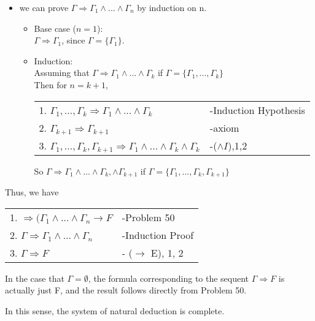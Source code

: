 \begin{enumerate}
\begin{itemize}
	\item we can prove $\Gamma \Rightarrow \Gamma_1 \wedge ... \wedge \Gamma_n$ by induction on n.\\
	  \begin{itemize}
		\item Base case ($n=1$):\\
		  $\Gamma \Rightarrow \Gamma_1$, since $\Gamma=\{\Gamma_1\}$.
		\item Induction:\\
		  Assuming that $\Gamma \Rightarrow \Gamma_1 \wedge ... \wedge \Gamma_k$ if $\Gamma=\{\Gamma_1, ..., \Gamma_k\}$\\
		  Then for $n=k+1$, \\
			\begin{tabular}{l l}
		  1. $\Gamma_1, ..., \Gamma_k \Rightarrow \Gamma_1 \wedge ... \wedge \Gamma_k$ & -Induction Hypothesis\\
											2. $\Gamma_{k+1} \Rightarrow \Gamma_{k+1}$ & -axiom\\
		  3. $\Gamma_1, ..., \Gamma_k, \Gamma_{k+1} \Rightarrow \Gamma_1 \wedge ... \wedge \Gamma_k \wedge \Gamma_k$ & -($\wedge I$),1,2\\ 
			\end{tabular}
		\newline
		  So $\Gamma \Rightarrow \Gamma_1 \wedge ...  \wedge \Gamma_k, \wedge \Gamma_{k+1}$ if $\Gamma=\{\Gamma_1, ..., \Gamma_k, \Gamma_{k+1}\}$\\
	  \end{itemize}
  \end{itemize}
  Thus, we have\\
  \begin{tabular}{l l}
	1. $\Rightarrow (\Gamma_1 \wedge ... \wedge \Gamma_n \rightarrow F$ & -Problem 50\\
			2. $\Gamma \Rightarrow \Gamma_1 \wedge ... \wedge \Gamma_n$ & -Induction Proof\\
	  3. $\Gamma \Rightarrow F$ & - ($\rightarrow$ E), 1, 2\\
  \end{tabular}
  \newline
	 In the case that $\Gamma=\emptyset$, the formula corresponding to the sequent $\Gamma \Rightarrow F$ is actually just F, and the result follows directly from Problem 50.\\

\end{enumerate}

In this sense, the system of natural deduction is complete. 

